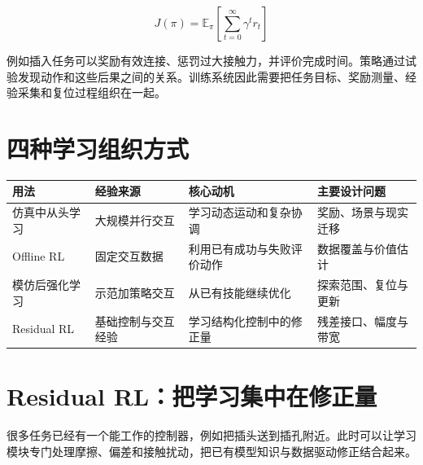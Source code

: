 \documentclass[UTF8,a4paper,11pt,oneside,openany,fontset=none]{ctexbook}
\begin{document}
\[
J(\pi)=\mathbb E_\pi\left[\sum_{t=0}^{\infty}\gamma^t r_t\right]
\]

例如插入任务可以奖励有效连接、惩罚过大接触力，并评价完成时间。策略通过试验发现动作和这些后果之间的关系。训练系统因此需要把任务目标、奖励测量、经验采集和复位过程组织在一起。

\section{四种学习组织方式}

{\small %
\begin{longtable}[]{@{}
  >{\raggedright\arraybackslash}p{}
  >{\raggedright\arraybackslash}p{}
  >{\raggedright\arraybackslash}p{}
  >{\raggedright\arraybackslash}p{}@{}}
\toprule\noalign{}
\begin{minipage}[b]{\linewidth}\raggedright
用法
\end{minipage} & \begin{minipage}[b]{\linewidth}\raggedright
经验来源
\end{minipage} & \begin{minipage}[b]{\linewidth}\raggedright
核心动机
\end{minipage} & \begin{minipage}[b]{\linewidth}\raggedright
主要设计问题
\end{minipage} \\
\midrule\noalign{}
\endhead
\bottomrule\noalign{}
\endlastfoot
仿真中从头学习 & 大规模并行交互 & 学习动态运动和复杂协调 & 奖励、场景与现实迁移 \\
Offline RL & 固定交互数据 & 利用已有成功与失败评价动作 & 数据覆盖与价值估计 \\
模仿后强化学习 & 示范加策略交互 & 从已有技能继续优化 & 探索范围、复位与更新 \\
Residual RL & 基础控制与交互经验 & 学习结构化控制中的修正量 & 残差接口、幅度与带宽 \\
\end{longtable}
}

\section{Residual RL：把学习集中在修正量}\label{residual-rlux628aux5b66ux4e60ux96c6ux4e2dux5728ux4feeux6b63ux91cf}

很多任务已经有一个能工作的控制器，例如把插头送到插孔附近。此时可以让学习模块专门处理摩擦、偏差和接触扰动，把已有模型知识与数据驱动修正结合起来。\cite{R04}
\end{document}
